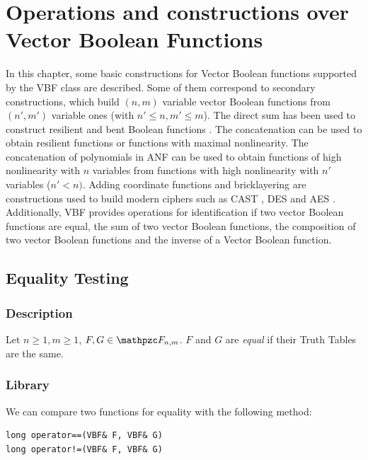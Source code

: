 \chapter{Operations and constructions over Vector Boolean Functions}

In this chapter, some basic constructions for Vector Boolean functions supported by the VBF
class are described. Some of them correspond to secondary
constructions, which build $(n,m)$ variable vector Boolean functions from
$(n',m')$ variable ones (with $n' \leq n, m' \leq m$). The direct sum has been
used to construct resilient and bent Boolean functions
 \cite{Carlet:04}. The concatenation can be used to obtain resilient functions or functions with maximal nonlinearity. The concatenation of polynomials in ANF can be used to obtain functions of high nonlinearity with $n$ variables from functions with high nonlinearity with $n'$ variables ($n' < n)$. Adding coordinate functions and bricklayering are constructions
used to build modern ciphers such as CAST \cite{CAST:256},  DES \cite{DES:77}
and AES \cite{DaemenR:02}. Additionally, VBF provides operations for
identification if two vector Boolean functions are equal, the sum of two
vector Boolean functions, the composition of two vector Boolean functions and the inverse of a Vector Boolean function.  

\section{Equality Testing}

\subsection{Description}

\begin{definition}
Let $n \geq 1, m \geq 1$, $F,G \in \funct{F}_{n,m}$. $F$ and $G$ are \textit{equal} if their Truth Tables are the same.   
\end{definition}

\subsection{Library}

We can compare two functions for equality with the following method: 

\begin{verbatim}
long operator==(VBF& F, VBF& G)
long operator!=(VBF& F, VBF& G)
\end{verbatim}

